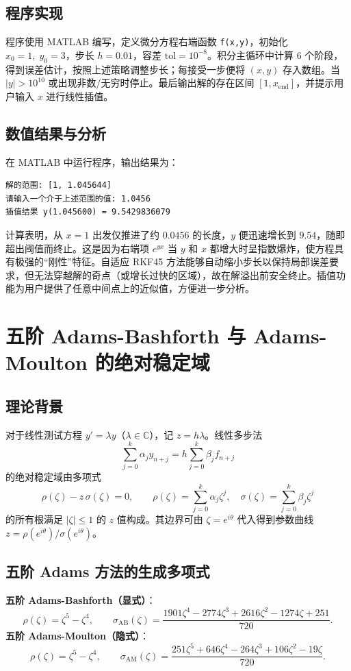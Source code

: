 \documentclass[12pt,a4paper]{article}
\begin{document}
\subsection{程序实现}
程序使用 MATLAB 编写，定义微分方程右端函数 \texttt{f(x,y)}，初始化 $x_0=1,\; y_0=3$，步长 $h=0.01$，容差 $\text{tol}=10^{-8}$。积分主循环中计算 6 个阶段，得到误差估计，按照上述策略调整步长；每接受一步便将 $(x, y)$ 存入数组。当 $|y| > 10^{10}$ 或出现非数/无穷时停止。最后输出解的存在区间 $[1, x_{\text{end}}]$，并提示用户输入 $x$ 进行线性插值。

\subsection{数值结果与分析}
在 MATLAB 中运行程序，输出结果为：
\begin{verbatim}
解的范围: [1, 1.045644]
请输入一个介于上述范围的值: 1.0456
插值结果 y(1.045600) = 9.5429836079
\end{verbatim}
计算表明，从 $x=1$ 出发仅推进了约 $0.0456$ 的长度，$y$ 便迅速增长到 $9.54$，随即超出阈值而终止。这是因为右端项 $e^{y x}$ 当 $y$ 和 $x$ 都增大时呈指数爆炸，使方程具有极强的“刚性”特征。自适应 RKF45 方法能够自动缩小步长以保持局部误差要求，但无法穿越解的奇点（或增长过快的区域），故在解溢出前安全终止。插值功能为用户提供了任意中间点上的近似值，方便进一步分析。

\section{五阶 Adams-Bashforth 与 Adams-Moulton 的绝对稳定域}

\subsection{理论背景}
对于线性测试方程 $y' = \lambda y$（$\lambda \in \mathbb{C}$），记 $z = h\lambda$。线性多步法
\[
\sum_{j=0}^{k} \alpha_j y_{n+j} = h \sum_{j=0}^{k} \beta_j f_{n+j}
\]
的绝对稳定域由多项式
\[
\rho(\zeta) - z\,\sigma(\zeta) = 0, \qquad \rho(\zeta) = \sum_{j=0}^{k} \alpha_j \zeta^j,\quad \sigma(\zeta) = \sum_{j=0}^{k} \beta_j \zeta^j
\]
的所有根满足 $|\zeta| \le 1$ 的 $z$ 值构成。其边界可由 $\zeta = e^{i\theta}$ 代入得到参数曲线 $z = \rho(e^{i\theta}) / \sigma(e^{i\theta})$。

\subsection{五阶 Adams 方法的生成多项式}
\textbf{五阶 Adams-Bashforth（显式）}：
\[
\rho(\zeta) = \zeta^5 - \zeta^4,\qquad
\sigma_{\text{AB}}(\zeta) = \frac{1901\zeta^4 - 2774\zeta^3 + 2616\zeta^2 - 1274\zeta + 251}{720}.
\]
\textbf{五阶 Adams-Moulton（隐式）}：
\[
\rho(\zeta) = \zeta^5 - \zeta^4,\qquad
\sigma_{\text{AM}}(\zeta) = \frac{251\zeta^5 + 646\zeta^4 - 264\zeta^3 + 106\zeta^2 - 19\zeta}{720}.
\]
\end{document}
